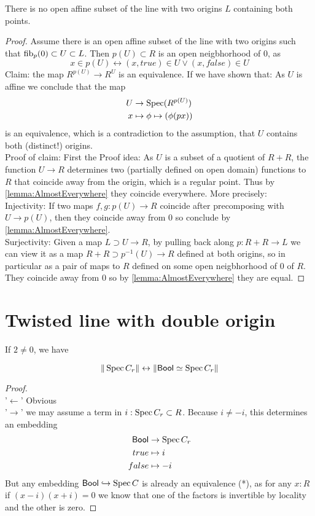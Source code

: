 \documentclass{article}
\newcommand{\Bool}{\mathsf{Bool}}
\begin{document}
\begin{lemma}{\label{lemma:noAffNbhd}}
	There is no open affine subset of the line with two origins $L$ containing both points.
\end{lemma}
\begin{proof}
	Assume there is an open affine subset of the line with two origins such that $\operatorname{fib}_p(0) \subset U \subset L$. Then $p(U) \subset R$ is an open neigbhorhood of 0, as 
	\[
	x \in p(U) \leftrightarrow (x,true) \in U \lor (x,false) \in U
	\]
	Claim: the map $R^{p(U)} \to R^U$ is an equivalence. If we have shown that: As $U$ is affine we conclude that the map
	\begin{align*}
		U &\to \operatorname{Spec} (R^{p(U)}) \\
		x &\mapsto \phi \mapsto (\phi(px))		
	\end{align*}
	is an equivalence, which is a contradiction to the assumption, that $U$ contains both (distinct!) origins. \\
	Proof of claim: 
	First the Proof idea: As $U$ is a subset of a quotient of $R + R$, the function $U \to R$ determines two (partially defined on open domain) functions to $R$ that coincide away from the origin, which is a regular point. Thus by \ref{lemma:AlmostEverywhere} they coincide everywhere. More precisely:\\
	Injectivity: If two maps $f , g : p(U) \to R$ coincide after precomposing with $U \to p(U)$, then they coincide away from $0$
	so conclude by \ref{lemma:AlmostEverywhere}. \\
	Surjectivity: Given a map $L \supset U \to R$, by pulling back along $p : R + R \to L$  we can view it as a map $R + R \supset p^{-1}(U) \to R$ defined at both origins, so in particular as a pair of maps to $R$ defined on some open neigbhorhood of 0 of $R$. They coincide away from 0 so by \ref{lemma:AlmostEverywhere} they are equal.
\end{proof}
\section{Twisted line with double origin}

\begin{lemma}{\label{lemma:BoolSpecC}}
	If $2 \neq 0$, we have 
	
	\[\| \Spec C_r \| \leftrightarrow \|\Bool \simeq \Spec C_r\|\]
	
\end{lemma}
\begin{proof}
	\ \\ '$\leftarrow$' 
	Obvious \\
	'$\rightarrow$' 	we may assume a term in $i : \operatorname{Spec} C_r\subset R$. Because $i \neq -i$, this determines an embedding 
	\begin{align*}
		\Bool &\to \Spec C_r \\
		true &\mapsto i \\
		false &\mapsto -i
	\end{align*}
	But any embedding $\Bool \hookrightarrow \Spec C$ is already an equivalence (*), as for any $x : R$ if $(x-i)(x+i) = 0$ we know that one of the factors is invertible by locality and the other is zero.
\end{proof}
\end{document}
